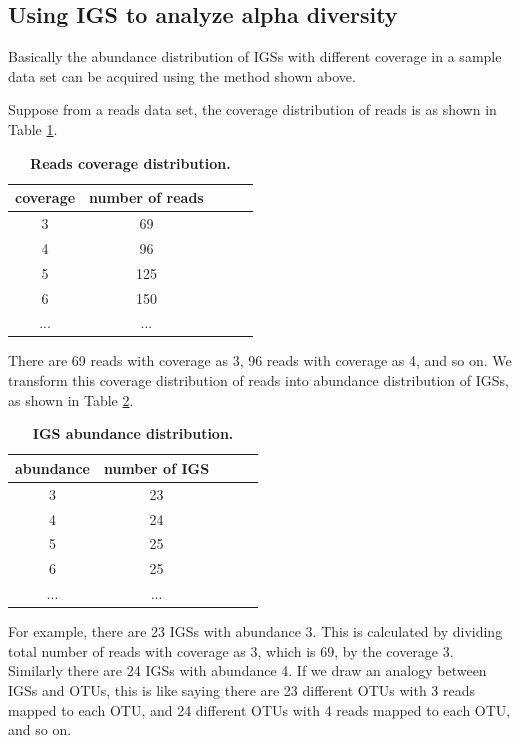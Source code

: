 \subsection{Using IGS to analyze alpha diversity}

Basically the abundance distribution of IGSs with different coverage in a 
sample data set can be acquired using the method shown above.

Suppose from a reads data set, the coverage distribution of reads is as 
shown in Table \ref{table:read_coverage}.

\begin{table}[!ht]
\centering
\begin{tabular}{|c|c|c|c|c|}
\hline 
coverage & number of reads \\
\hline 
3                   & 69  \\
4                  & 96  \\
5                  & 125 \\
6                   & 150 \\
...        & ... \\
\hline 
\end{tabular}

\caption{\bf Reads coverage distribution.}
\label{table:read_coverage}
\end{table}

There are 69 reads with coverage as 3, 96 reads with coverage as 4, 
and so on. We transform this coverage distribution
of reads into abundance distribution of IGSs, as shown in Table \ref{table:igs_coverage}.

\begin{table}[!ht]
\centering
\begin{tabular}{ |c | c |c| c|c| }
\hline 
abundance & number of IGS \\
\hline 
3                   & 23  \\
4                  & 24  \\
5                  & 25 \\
6        & 25 \\
...        & ... \\
\hline 
\end{tabular}

\caption{\bf IGS abundance distribution.}
\label{table:igs_coverage}
\end{table}

For example, there are 23 IGSs with abundance 3. This is calculated by dividing  
total number of reads with coverage as 3, which is 69, by the coverage 3.
Similarly there are 24 IGSs with abundance 4. 
If we draw an analogy between IGSs and OTUs, this is like saying there are 23 
different OTUs with 3 reads mapped to each OTU, and 24 different OTUs with 4 reads mapped to each OTU, and so on.

